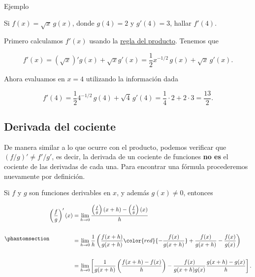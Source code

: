 \documentclass[
  letterpaper,
]{book}
\theoremstyle{plain}
\theoremstyle{remark}
\begin{document}
Ejemplo

Si \(f(x)=\sqrt{x}\,g(x)\), donde \(g(4)=2\) y \(g'(4)=3\), hallar
\(f'(4)\).

\begin{tcolorbox}[enhanced jigsaw, opacityback=0, left=2mm, opacitybacktitle=0.6, toprule=.15mm, bottomrule=.15mm, colbacktitle=quarto-callout-tip-color!10!white, titlerule=0mm, bottomtitle=1mm, title=\textcolor{quarto-callout-tip-color}{\faLightbulb}\hspace{0.5em}{Solución}, toptitle=1mm, colframe=quarto-callout-tip-color-frame, colback=white, breakable, rightrule=.15mm, arc=.35mm, leftrule=.75mm, coltitle=black]

Primero calculamos \(f'(x)\) usando la
\hyperref[eq-regla-producto]{regla del producto}. Tenemos que

\[
f'(x)=\left(\sqrt{x}\right)'g(x)+\sqrt{x}g'(x)=\frac{1}{2}x^{-1/2}\,g(x)+\sqrt{x}\,g'(x).
\]

Ahora evaluamos en \(x=4\) utilizando la información dada

\[
f'(4)=\frac{1}{2} 4^{-1/2}\,g(4)+\sqrt{4}\,g'(4)=\frac{1}{4}\cdot 2+2\cdot 3=\frac{13}{2}.
\]

\end{tcolorbox}

\subsection{Derivada del cociente}\label{derivada-del-cociente}

De manera similar a lo que ocurre con el producto, podemos verificar que
\((f/g)'\neq f'/g'\), es decir, la derivada de un cociente de funciones
\textbf{no es} el cociente de las derivadas de cada una. Para encontrar
una fórmula procederemos nuevamente por definición.

Si \(f\) y \(g\) son funciones derivables en \(x\), y además
\(g(x)\neq 0\), entonces

\begin{equation}\phantomsection\label{eq-derivada-cociente}{
\begin{aligned}
\left(\frac{f}{g}\right)'(x)&=\lim_{h\to 0}\frac{\left(\frac{f}{g}\right)(x+h)-\left(\frac{f}{g}\right)(x)}{h}\\
\\
&=\lim_{h\to 0} \frac{1}{h}\left(\frac{f(x+h)}{g(x+h)}{\color{red}{-\frac{f(x)}{g(x+h)}}+\frac{f(x)}{g(x+h)}}-\frac{f(x)}{g(x)}\right)\\
\\
&=\lim_{h\to 0} \left[\frac{1}{g(x+h)}\left(\frac{f(x+h)-f(x)}{h}\right)-\frac{f(x)}{g(x+h)g(x)}\frac{g(x+h)-g(x)}{h}\right].
\end{aligned}
}\end{equation}
\end{document}
